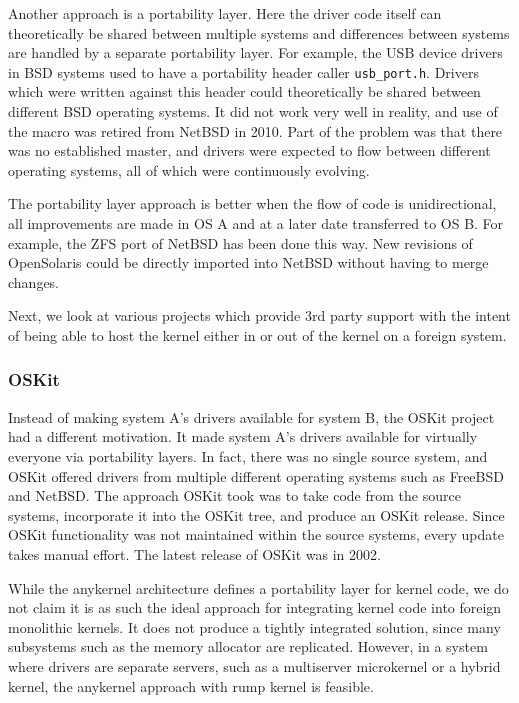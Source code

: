 Another approach is a portability layer.  Here the driver
code itself can theoretically be shared between multiple systems
and differences between systems are handled by a separate portability
layer.  For example, the USB device drivers in BSD systems used to
have a portability header caller \verb+usb_port.h+.  Drivers which
were written against this header could theoretically be shared
between different BSD operating systems.  It did not work very well
in reality, and use of the macro was retired from NetBSD in 2010.
Part of the problem was that there was no established master, and
drivers were expected to flow between different operating systems,
all of which were continuously evolving.

The portability layer approach is better when the flow of code is
unidirectional, \ie all improvements are made in OS A and at a
later date transferred to OS B.  For example, the ZFS port of NetBSD
has been done this way.  New revisions of OpenSolaris could be
directly imported into NetBSD without having to merge changes.

Next, we look at various projects which provide 3rd party support
with the intent of being able to host the kernel either in or out of
the kernel on a foreign system.

\subsubsection*{OSKit}

Instead of making system A's drivers available for system B, the OSKit
project~\cite{ford:oskit} had a different motivation.
It made system A's drivers available for virtually everyone
via portability layers.  In fact, there was no single source system,
and OSKit offered drivers from multiple different operating systems
such as FreeBSD and NetBSD.  The approach OSKit took was to take
code from the source systems, incorporate it into the OSKit tree,
and produce an OSKit release.  Since OSKit functionality was not
maintained within the source systems, every update takes manual
effort.  The latest release of OSKit was in 2002.

While the anykernel architecture defines a portability layer for
kernel code, we do not claim it is as such the ideal approach for
integrating kernel code into foreign monolithic kernels.  It does
not produce a tightly integrated solution, since many subsystems
such as the memory allocator are replicated.  However, in a system
where drivers are separate servers, such as a multiserver microkernel
or a hybrid kernel, the anykernel approach with rump kernel is feasible.

